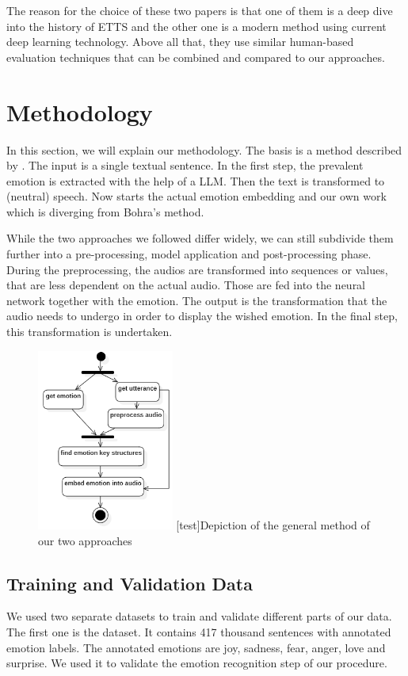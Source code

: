 \documentclass[11pt]{article}
\begin{document}

The reason for the choice of these two papers is that one of them is a deep dive into the history of ETTS and the other one is a modern method using current deep learning technology. Above all that, they use similar human-based evaluation techniques that can be combined and compared to our approaches.

\section{Methodology}
In this section, we will explain our methodology. The basis is a method described by \cite{bohra_smart_2022}. The input is a single textual sentence. In the first step, the prevalent emotion is extracted with the help of a LLM. Then the text is transformed to (neutral) speech. Now starts the actual emotion embedding and our own work which is diverging from Bohra's method.

While the two approaches we followed differ widely, we can still subdivide them further into a pre-processing, model application and post-processing phase. During the preprocessing, the audios are transformed into sequences or values, that are less dependent on the actual audio. Those are fed into the neural network together with the emotion. The output is the transformation that the audio needs to undergo in order to display the wished emotion. In the final step, this transformation is undertaken.

\begin{figure}[h]
 \centering
\includegraphics[width=0.4\textwidth]{"Bilder/Prozess.PNG"}
[test]{Depiction of the general method of our two approaches}
\end{figure}

\subsection{Training and Validation Data}
We used two separate datasets to train and validate different parts of our data.
The first one is the \cite{saravia-etal-2018-carer} dataset. It contains 417 thousand sentences with annotated emotion labels. The annotated emotions are joy, sadness, fear, anger, love and surprise. We used it to validate the emotion recognition step of our procedure.
\end{document}
